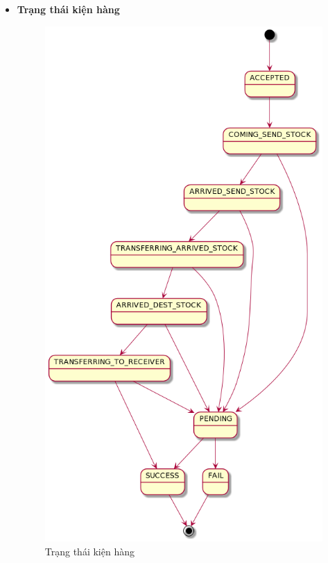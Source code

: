 \begin{itemize}
    	
    	\item \textbf{Trạng thái kiện hàng}
    	
    	\begin{figure}[H]
    		\centering
    		\includegraphics[width=0.7\linewidth]{Images/suborderstatus.png}
    		\linebreak
    		\caption{Trạng thái kiện hàng}
    	\end{figure}
    

\end{itemize}
